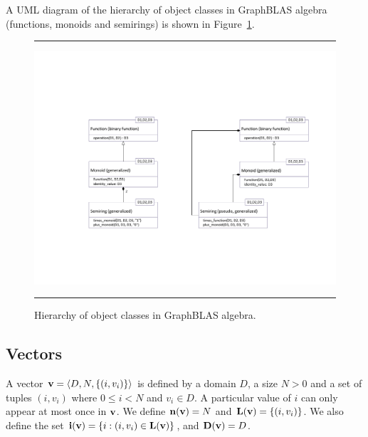 \documentclass[11pt]{extarticle}
\begin{document}
A UML diagram of the hierarchy of object classes in GraphBLAS
algebra (functions, monoids and semirings) is shown in 
Figure~\ref{Fig:AlgebraHierarchy}.

\begin{figure}[htb]
\hrule
\begin{center}
\includegraphics[width=1.0\linewidth,trim=0in 2in 0in 2in]{Algebra_Hierarchy.pdf}
\end{center}
\caption{Hierarchy of object classes in GraphBLAS algebra.}
\label{Fig:AlgebraHierarchy}
\hrule
\end{figure}

\subsection{Vectors}

 

A vector ${\bf v} = \langle D, N, \{ (i,v_i) \} \rangle$ is defined
by a domain $D$, a size $N>0$ and a set of tuples $(i,v_i)$ where
$0 \leq i < N$ and $v_i \in D$. A particular value of $i$ can only
appear at most once in ${\bf v}$. We define $\bold{n}({\bf v}) =
N$ and $\bold{L}({\bf v}) = \{ (i,v_i) \}$. We also define the set
${\bf i({\bf v})} = \{ i : (i,v_i) \in \bold{L}({\bf v}) \}$,
and $\bold{D}({\bf v}) = D$.

\end{document}
